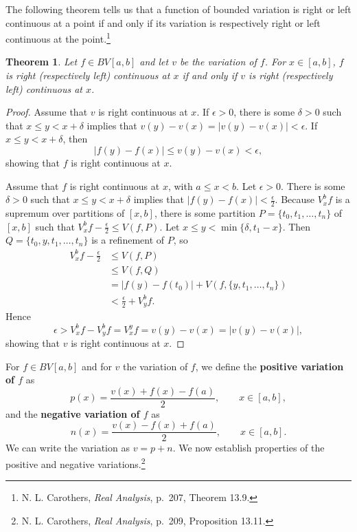 \documentclass{article}
\newtheorem{theorem}{Theorem}
\theoremstyle{definition}
\begin{document}
The following theorem tells us that a function of bounded variation is right or left continuous at a point if and only if its variation is respectively right or left continuous at the point.\footnote{N. L. Carothers, {\em Real Analysis}, p.~207, Theorem 13.9.}

\begin{theorem}
Let $f \in BV[a,b]$ and let $v$ be the variation of $f$. For $x \in [a,b]$,
 $f$ is right (respectively left) continuous  at $x$ if and only if $v$ is right (respectively left) continuous at $x$.
\end{theorem}
\begin{proof}
Assume that $v$ is right continuous at $x$. If $\epsilon>0$, there is some $\delta>0$ such that
$x\leq y<x+\delta$ implies that  $v(y)-v(x) = |v(y)-v(x)| < \epsilon$. If $x\leq y<x+\delta$, then
\[
|f(y)-f(x)| \leq v(y)-v(x) < \epsilon,
\]
showing that $f$ is right continuous at $x$.

Assume that $f$ is right continuous at $x$, with $a \leq x < b$. Let $\epsilon>0$. There is some
$\delta>0$ such that $x \leq y<x+\delta$ implies that $|f(y)-f(x)| < \frac{\epsilon}{2}$.
Because $V_x^b f$ is a supremum over partitions of $[x,b]$, there is some partition $P=\{t_0,t_1,\ldots,t_n\}$ of $[x,b]$ such that
$V_x^b f - \frac{\epsilon}{2} \leq V(f,P)$.
Let $x \leq y < \min\{\delta, t_1-x\}$. Then
$Q=\{t_0,y,t_1,\ldots,t_n\}$ is a refinement of $P$, so
\begin{align*}
V_x^b f -\frac{\epsilon}{2}&\leq V(f,P)\\
&\leq V(f,Q)\\
&=|f(y)-f(t_0)|+V(f,\{y,t_1,\ldots,t_n\})\\
&< \frac{\epsilon}{2}+V_y^b f.
\end{align*}
Hence
\[
\epsilon>V_x^b f - V_y^b f = V_x^y f  = v(y)-v(x) = |v(y)-v(x)|,
\]
showing that $v$ is right continuous at $x$.
\end{proof}



For $f \in BV[a,b]$ and for $v$ the variation of $f$, we define the \textbf{positive variation of $f$} as
\[
p(x)=\frac{v(x)+f(x)-f(a)}{2}, \qquad x \in [a,b],
\]
and the \textbf{negative variation of $f$} as
\[
n(x)=\frac{v(x)-f(x)+f(a)}{2}, \qquad x \in [a,b].
\]
We can write the variation as $v=p+n$. We now establish properties of the positive and negative variations.\footnote{N. L. Carothers, {\em Real Analysis}, p.~209, Proposition 13.11.}
\end{document}
